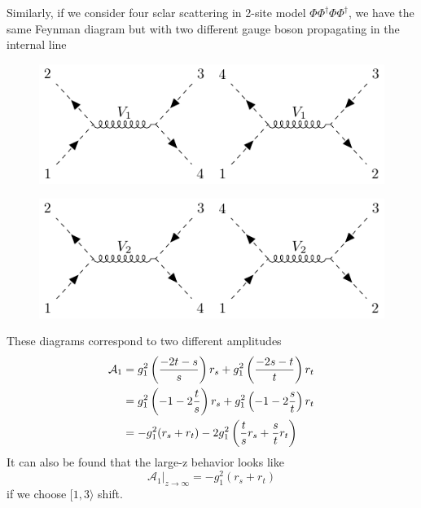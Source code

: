 \documentclass[12pt]{article}
\numberwithin{equation}{section}
\begin{document}
Similarly, if we consider four sclar scattering in 2-site model $\Phi\Phi^\dagger\Phi\Phi^\dagger$, we have the same Feynman diagram but with two different gauge boson propagating in the internal line
\begin{figure}[H]
    \centering
    \includegraphics{4ptt1.pdf}
\end{figure}
\begin{figure}[H]
    \centering
    \includegraphics{4ptt2.pdf}
\end{figure}
These diagrams correspond to two different amplitudes
\begin{align}
    \mathcal{A}_1&=g_1^2\left(\frac{-2t-s}{s}\right)r_s+g_1^2\left(\frac{-2s-t}{t}\right)r_t\notag\\
    &=g_1^2\left(-1-2\frac{t}{s}\right)r_s+g_1^2\left(-1-2\frac{s}{t}\right)r_t\notag\\
    &=-g_1^2(r_s+r_t)-2g_1^2\left(\frac{t}{s}r_s+\frac{s}{t}r_t\right)
\end{align}
It can also be found that the large-z behavior looks like
\begin{equation}
    \mathcal{A}_1|_{z\rightarrow\infty}=-g_1^2(r_s+r_t)
\end{equation}
if we choose $[1,3\rangle$ shift.
\end{document}
